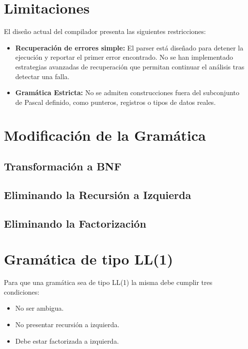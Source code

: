 \documentclass[12pt]{article}
\begin{document}
\section{Limitaciones}
El diseño actual del compilador presenta las siguientes restricciones:
\begin{itemize}
    \item \textbf{Recuperación de errores simple:} El parser está diseñado para detener la ejecución y reportar el primer error encontrado. No se han implementado estrategias avanzadas de recuperación que permitan continuar el análisis tras detectar una falla.
    \item \textbf{Gramática Estricta:} No se admiten construcciones fuera del subconjunto de Pascal definido, como punteros, registros o tipos de datos reales.
\end{itemize}
\newpage
\section{Modificación de la Gramática}

\subsection{Transformación a BNF}



\subsection{Eliminando la Recursión a Izquierda}



\subsection{Eliminando la Factorización}




\section{Gramática de tipo LL(1)}

Para que una gramática sea de tipo LL(1) la misma debe cumplir tres condiciones:

\begin{itemize}
    \item No ser ambigua.
    \item No presentar recursión a izquierda.
    \item Debe estar factorizada a izquierda.
\end{itemize}
\end{document}
